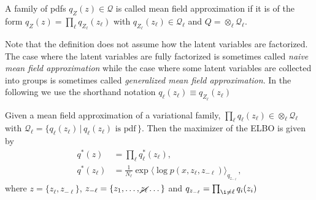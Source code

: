 \begin{definition}
	A family of pdfs $q_Z(z) \in \mathcal Q$ is called mean field approximation if it is of the form $q_Z(z) = \prod _\ell q_{Z_\ell}(z_\ell)$ with  
	$q_{Z_\ell}(z_\ell)\in\mathcal Q_\ell $ and $Q = \otimes_\ell\mathcal Q_\ell$.
\end{definition}
Note that the definition does not assume how the latent variables are factorized. The case where the latent variables are fully factorized is sometimes called \textit{naive mean field approximation} while the case where  some latent variables are collected into groups is sometimes called \textit{generalized mean field approximation}.
In the following we use the shorthand notation $q_\ell(z_\ell) \equiv q_{Z_\ell}(z_\ell)$
\begin{theorem}\label{thm:mf_elbo}
	Given a mean field approximation of a variational family,  $\prod _\ell q_\ell(z_\ell) \in  \otimes_\ell \mathcal Q_\ell$ with $\mathcal Q_\ell=\{q_\ell(z_\ell)\,|\,q_\ell(z_\ell) \text{ is pdf}\,\}$. Then the maximizer of the ELBO is given by
	\begin{align}
		q^*(z) &= \prod _\ell q^*_\ell(z_\ell), \label{eq: mean_field_joint}\\
		q^*(z_\ell) &= \frac{1}{N_\ell} \exp{\langle \log p(x, z_\ell, z_{-\ell}) \rangle_{q_{z_{-\ell}}}}, \label{eq:mean_field_update}
	\end{align}
	where $z=\{z_\ell, z_{-\ell} \}$,  $z_{-\ell} = \{z_1, \dots, \cancel{z_\ell} \dots\}$ and $q_{z_{-\ell}} = \prod _{\i\neq \ell} q_i(z_i)$
\end{theorem}
